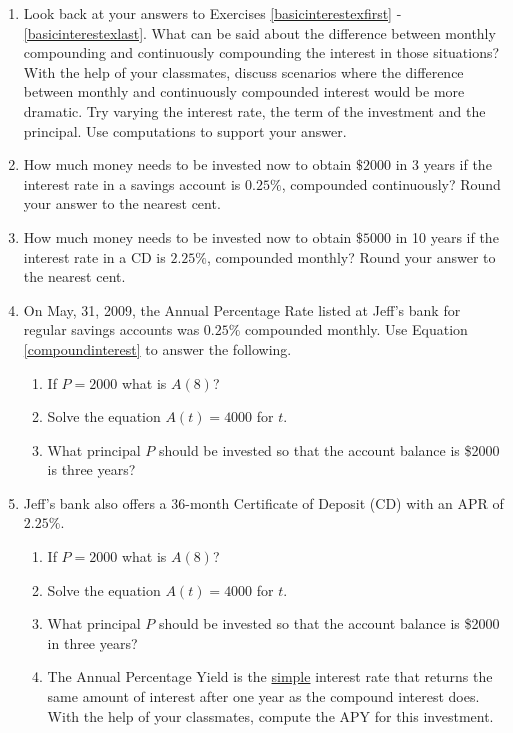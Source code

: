 \documentclass{ximera}
\begin{document}
\begin{enumerate}
\setcounter{enumi}{\value{HW}}

\item  Look back at your answers to Exercises \ref{basicinterestexfirst} - \ref{basicinterestexlast}. What can be said about the difference between monthly compounding and continuously compounding the interest in those situations?  With the help of your classmates, discuss scenarios where the difference between monthly  and continuously compounded interest would be more dramatic.  Try varying the interest rate, the term of the investment and the principal.  Use computations to support your answer.

\item  How much money needs to be invested now to obtain $\$2000$ in 3 years if the interest rate in a savings account is $0.25 \%$, compounded continuously?  Round your answer to the nearest cent.

\item  How much money needs to be invested now to obtain $\$5000$ in  10 years if the interest rate in a CD is $2.25 \%$, compounded monthly?  Round your answer to the nearest cent.


\item On May, 31, 2009, the Annual Percentage Rate listed at Jeff's bank for regular savings accounts was $0.25\%$ compounded monthly.  Use Equation \ref{compoundinterest} to answer the following.

\begin{enumerate}

\item If $P = 2000$ what is $A(8)$?
\item Solve the equation $A(t) = 4000$ for $t$.
\item What principal $P$ should be invested so that the account balance is \$2000 is three years?

\end{enumerate}

\pagebreak

\item Jeff's bank also offers a 36-month Certificate of Deposit (CD) with an APR of $2.25\%$.

\begin{enumerate}

\item If $P = 2000$ what is $A(8)$?
\item Solve the equation $A(t) = 4000$ for $t$.
\item What principal $P$ should be invested so that the account balance is \$2000 in three years?
\item The Annual Percentage Yield is the \underline{simple} interest rate that returns the same amount of interest after one year as the compound interest does.  With the help of your classmates, compute the APY for this investment.


\end{enumerate}
\end{enumerate}
\end{document}
